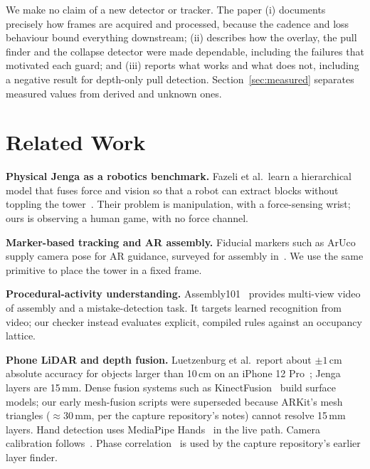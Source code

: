 \documentclass[conference,10pt]{IEEEtran}
\begin{document}
We make no claim of a new detector or tracker. The paper (i) documents precisely how frames are acquired and processed, because the cadence and loss behaviour bound everything downstream; (ii) describes how the overlay, the pull finder and the collapse detector were made dependable, including the failures that motivated each guard; and (iii) reports what works and what does not, including a negative result for depth-only pull detection. Section~\ref{sec:measured} separates measured values from derived and unknown ones.

\section{Related Work}
\textbf{Physical Jenga as a robotics benchmark.} Fazeli et al.\ learn a hierarchical model that fuses force and vision so that a robot can extract blocks without toppling the tower~\cite{fazeli2019}. Their problem is manipulation, with a force-sensing wrist; ours is observing a human game, with no force channel.

\textbf{Marker-based tracking and AR assembly.} Fiducial markers such as ArUco~\cite{garrido2014} supply camera pose for AR guidance, surveyed for assembly in~\cite{wang2016}. We use the same primitive to place the tower in a fixed frame.

\textbf{Procedural-activity understanding.} Assembly101~\cite{sener2022} provides multi-view video of assembly and a mistake-detection task. It targets learned recognition from video; our checker instead evaluates explicit, compiled rules against an occupancy lattice.

\textbf{Phone LiDAR and depth fusion.} Luetzenburg et al.\ report about $\pm1$\,cm absolute accuracy for objects larger than 10\,cm on an iPhone 12 Pro~\cite{luetzenburg2021}; Jenga layers are 15\,mm. Dense fusion systems such as KinectFusion~\cite{newcombe2011} build surface models; our early mesh-fusion scripts were superseded because ARKit's mesh triangles ($\approx$30\,mm, per the capture repository's notes) cannot resolve 15\,mm layers. Hand detection uses MediaPipe Hands~\cite{zhang2020mediapipe} in the live path. Camera calibration follows~\cite{zhang2000}. Phase correlation~\cite{kuglin1975} is used by the capture repository's earlier layer finder.
\end{document}
